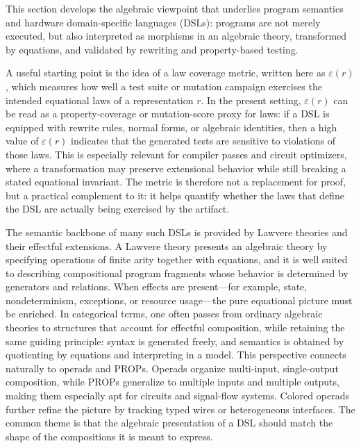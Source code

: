 This section develops the algebraic viewpoint that underlies program semantics and hardware domain-specific languages (DSLs): programs are not merely executed, but also interpreted as morphisms in an algebraic theory, transformed by equations, and validated by rewriting and property-based testing.

A useful starting point is the idea of a law coverage metric, written here as \(\varepsilon(r)\), which measures how well a test suite or mutation campaign exercises the intended equational laws of a representation \(r\). In the present setting, \(\varepsilon(r)\) can be read as a property-coverage or mutation-score proxy for laws: if a DSL is equipped with rewrite rules, normal forms, or algebraic identities, then a high value of \(\varepsilon(r)\) indicates that the generated tests are sensitive to violations of those laws. This is especially relevant for compiler passes and circuit optimizers, where a transformation may preserve extensional behavior while still breaking a stated equational invariant. The metric is therefore not a replacement for proof, but a practical complement to it: it helps quantify whether the laws that define the DSL are actually being exercised by the artifact.

The semantic backbone of many such DSLs is provided by Lawvere theories and their effectful extensions. A Lawvere theory presents an algebraic theory by specifying operations of finite arity together with equations, and it is well suited to describing compositional program fragments whose behavior is determined by generators and relations. When effects are present---for example, state, nondeterminism, exceptions, or resource usage---the pure equational picture must be enriched. In categorical terms, one often passes from ordinary algebraic theories to structures that account for effectful composition, while retaining the same guiding principle: syntax is generated freely, and semantics is obtained by quotienting by equations and interpreting in a model. This perspective connects naturally to operads and PROPs. Operads organize multi-input, single-output composition, while PROPs generalize to multiple inputs and multiple outputs, making them especially apt for circuits and signal-flow systems. Colored operads further refine the picture by tracking typed wires or heterogeneous interfaces. The common theme is that the algebraic presentation of a DSL should match the shape of the compositions it is meant to express.

